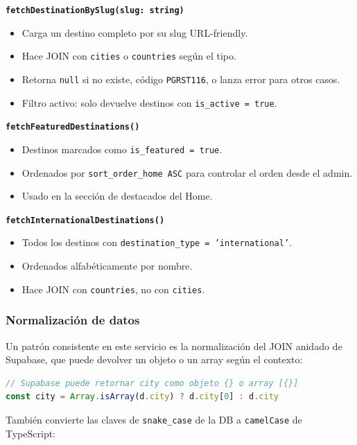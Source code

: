 \documentclass[12pt,letterpaper]{article}
\newcommand{\code}[1]{\texttt{#1}}
\begin{document}
\textbf{\code{fetchDestinationBySlug(slug: string)}}

\begin{itemize}
    \item Carga un destino completo por su slug URL-friendly.
    \item Hace JOIN con \code{cities} o \code{countries} según el tipo.
    \item Retorna \code{null} si no existe, código \code{PGRST116}, o lanza error para otros casos.
    \item Filtro activo: solo devuelve destinos con \code{is\_active = true}.
\end{itemize}

\textbf{\code{fetchFeaturedDestinations()}}

\begin{itemize}
    \item Destinos marcados como \code{is\_featured = true}.
    \item Ordenados por \code{sort\_order\_home ASC} para controlar el orden desde el admin.
    \item Usado en la sección de destacados del Home.
\end{itemize}

\textbf{\code{fetchInternationalDestinations()}}

\begin{itemize}
    \item Todos los destinos con \code{destination\_type = 'international'}.
    \item Ordenados alfabéticamente por nombre.
    \item Hace JOIN con \code{countries}, no con \code{cities}.
\end{itemize}

\subsubsection*{Normalización de datos}

Un patrón consistente en este servicio es la normalización del JOIN anidado de Supabase, que puede devolver un objeto o un array según el contexto:

\begin{lstlisting}[language=typescript]
// Supabase puede retornar city como objeto {} o array [{}]
const city = Array.isArray(d.city) ? d.city[0] : d.city
\end{lstlisting}

También convierte las claves de \code{snake\_case} de la DB a \code{camelCase} de TypeScript:
\end{document}
